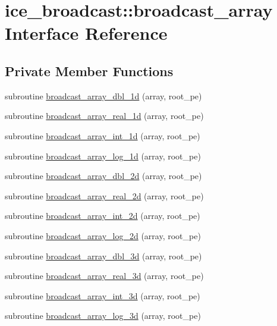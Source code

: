 \hypertarget{interfaceice__broadcast_1_1broadcast__array}{
\section{ice\_\-broadcast::broadcast\_\-array Interface Reference}
\label{interfaceice__broadcast_1_1broadcast__array}
}
\subsection*{Private Member Functions}
\begin{DoxyCompactItemize}
\item 
subroutine \hyperlink{interfaceice__broadcast_1_1broadcast__array_a1fbf86d91801935df2e994492360c87e}{broadcast\_\-array\_\-dbl\_\-1d} (array, root\_\-pe)
\item 
subroutine \hyperlink{interfaceice__broadcast_1_1broadcast__array_a460bc5374d7e5fc6eb13c1766573c509}{broadcast\_\-array\_\-real\_\-1d} (array, root\_\-pe)
\item 
subroutine \hyperlink{interfaceice__broadcast_1_1broadcast__array_a4934318e47c1536917cf8eb758e128c2}{broadcast\_\-array\_\-int\_\-1d} (array, root\_\-pe)
\item 
subroutine \hyperlink{interfaceice__broadcast_1_1broadcast__array_a231910fe6811b349e3ceaa4b2745158a}{broadcast\_\-array\_\-log\_\-1d} (array, root\_\-pe)
\item 
subroutine \hyperlink{interfaceice__broadcast_1_1broadcast__array_aae7fab0c9bc036988e2a3d63db3249ce}{broadcast\_\-array\_\-dbl\_\-2d} (array, root\_\-pe)
\item 
subroutine \hyperlink{interfaceice__broadcast_1_1broadcast__array_ab61709b9405642aa85b70bbe33dc3f9d}{broadcast\_\-array\_\-real\_\-2d} (array, root\_\-pe)
\item 
subroutine \hyperlink{interfaceice__broadcast_1_1broadcast__array_afa9d1329e1267aeee13ce2917d9b528c}{broadcast\_\-array\_\-int\_\-2d} (array, root\_\-pe)
\item 
subroutine \hyperlink{interfaceice__broadcast_1_1broadcast__array_ae6430f78293683f61bcea46c38e9a2cd}{broadcast\_\-array\_\-log\_\-2d} (array, root\_\-pe)
\item 
subroutine \hyperlink{interfaceice__broadcast_1_1broadcast__array_a0b6d8fba0fa8297c38daf5dba3ae2647}{broadcast\_\-array\_\-dbl\_\-3d} (array, root\_\-pe)
\item 
subroutine \hyperlink{interfaceice__broadcast_1_1broadcast__array_a897b1c7a8e6180c94de254cb0868e3ac}{broadcast\_\-array\_\-real\_\-3d} (array, root\_\-pe)
\item 
subroutine \hyperlink{interfaceice__broadcast_1_1broadcast__array_a6415e378f646e0ddc5a04611f35bcf2e}{broadcast\_\-array\_\-int\_\-3d} (array, root\_\-pe)
\item 
subroutine \hyperlink{interfaceice__broadcast_1_1broadcast__array_a62bd5d81d1fb0408e414f7648d282b3a}{broadcast\_\-array\_\-log\_\-3d} (array, root\_\-pe)
\end{DoxyCompactItemize}



